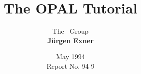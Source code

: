 


\title{\vspace*{1cm}
\Huge \bf The O{\LARGE\bf PAL} Tutorial}
\author{\Large The \opal\ Group\\[3ex]
{\bf J\"urgen Exner}}
\date{
\vspace*{1.3cm}
May 1994\\[12ex]
  Report No. 94-9}


\maketitle


